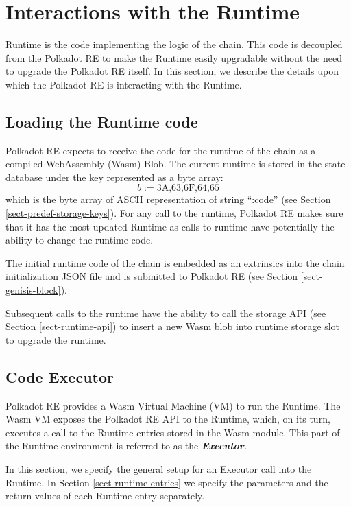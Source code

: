 \documentclass{article}
\newcommand{\assign}{:=}
\newcommand{\tmem}[1]{{\em #1\/}}
\newcommand{\tmstrong}[1]{\textbf{#1}}
\newcommand{\tmtextbf}[1]{{\bfseries{#1}}}
\newcommand{\tmtextit}[1]{{\itshape{#1}}}
\providecommand{\tmem}[1]{\tmtextit{#1}}
\providecommand{\tmstrong}[1]{\tmtextbf{#1}}
\providecommand{\tmtextbf}[1]{\tmtextbf{#1}}
\providecommand{\tmtextit}[1]{\tmtextit{#1}}
\begin{document}
\section{Interactions with the Runtime}\label{sect-entries-into-runtime}

Runtime is the code implementing the logic of the chain. This code is
decoupled from the Polkadot RE to make the Runtime easily upgradable without
the need to upgrade the Polkadot RE itself. In this section, we describe the
details upon which the Polkadot RE is interacting with the Runtime.

\subsection{Loading the Runtime code \ \ }

Polkadot RE expects to receive the code for the runtime of the chain as a
compiled WebAssembly (Wasm) Blob. The current runtime is stored in the state
database under the key represented as a byte array:
\[ b \assign \text{3A,63,6F,64,65} \]
which is the byte array of ASCII representation of string ``:code'' (see
Section \ref{sect-predef-storage-keys}). For any call to the runtime, Polkadot
RE makes sure that it has the most updated Runtime as calls to runtime have
potentially the ability to change the runtime code.

The initial runtime code of the chain is embedded as an extrinsics into the
chain initialization JSON file and is submitted to Polkadot RE (see Section
\ref{sect-genisis-block}).

Subsequent calls to the runtime have the ability to call the storage API (see
Section \ref{sect-runtime-api}) to insert a new Wasm blob into runtime storage
slot to upgrade the runtime.

\subsection{Code Executor}

Polkadot RE provides a Wasm Virtual Machine (VM) to run the Runtime. The Wasm
VM exposes the Polkadot RE API to the Runtime, which, on its turn, executes a
call to the Runtime entries stored in the Wasm module. This part of the
Runtime environment is referred to as the {\tmem{{\tmstrong{Executor}}.}}

In this section, we specify the general setup for an Executor call into the
Runtime. In Section \ref{sect-runtime-entries} we specify the parameters and
the return values of each Runtime entry separately.
\end{document}
